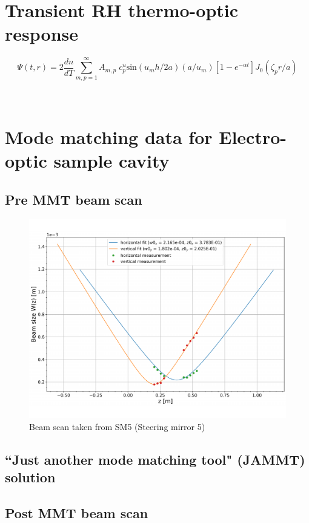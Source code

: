 \section{Transient RH thermo-optic response}

\begin{equation}
	\Psi(t,r)=2\frac{dn}{dT} \sum^{\infty}_{m,p = 1} A_{m,p} \; c^{u}_{p} \mathrm{sin}(u_m h /2a) (a/u_m)[1-e^{-\alpha t}] J_0(\zeta_p r/a)
\end{equation}

~\cite{ramette:2016}

\section{Mode matching data for Electro-optic sample cavity}

\subsection{Pre MMT beam scan}

\begin{figure}[H]
\includegraphics[width=\textwidth]{figs/ALGAAS/beam_scans/12_18_2020_preMMT.pdf}
\caption{Beam scan taken from SM5 (Steering mirror 5)}
\label{fig:beamscan2020}
\end{figure}

\subsection{``Just another mode matching tool" (JAMMT) solution}
\subsection{Post MMT beam scan}

